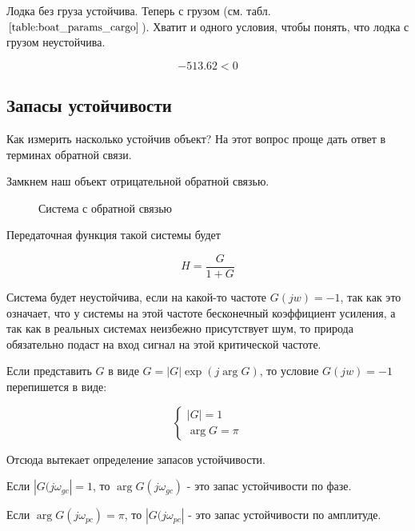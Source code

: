 \documentclass[a4paper]{article}
\begin{document}
Лодка без груза устойчива. Теперь с грузом (см. табл. $\ref{table:boat_params_cargo}$). Хватит и одного условия, чтобы понять, что лодка с грузом неустойчива.

$$ -513.62 < 0 $$

\subsection{Запасы устойчивости} 

Как измерить насколько устойчив объект? На этот вопрос проще дать ответ в терминах обратной связи.

Замкнем наш объект отрицательной обратной связью.

\begin{figure}
	\caption{Система с обратной связью}
\end{figure}

Передаточная функция такой системы будет

$$ H = \frac{G}{1+G} $$

Система будет неустойчива, если на какой-то частоте $G(jw) = -1$, так как это означает, что у системы на этой частоте бесконечный коэффициент усиления, а так как в реальных системах неизбежно присутствует шум, то природа обязательно подаст на вход сигнал на этой критической частоте. 

Если представить $G$ в виде $G = |G|\exp(j\arg G)$, то условие $G(jw) = -1$ перепишется в виде:

\begin{equation*}
	\begin{cases}
		|G| = 1 \\
		\arg G = \pi
	\end{cases}
\end{equation*}

Отсюда вытекает определение запасов устойчивости.

Если $|G(j\omega_{gc}| = 1$, то $\arg G(j\omega_{gc})$ - это запас устойчивости по фазе.

Если $\arg G(j\omega_{pc}) = \pi$, то $|G(j\omega_{pc}|$ - это запас устойчивости по амплитуде.
\end{document}
